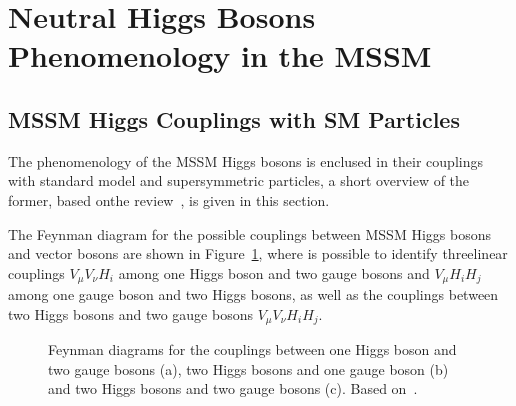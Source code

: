 \section{Neutral Higgs Bosons Phenomenology in the MSSM}\label{sec:pheno}

\subsection{MSSM Higgs Couplings with SM Particles}\label{sec:couplings}
The phenomenology of the MSSM Higgs bosons is enclused in their couplings with standard model and supersymmetric particles, 
a short overview of the former, based onthe review~\cite{Djuadi}, is given in this section.

The Feynman diagram for the possible couplings between MSSM Higgs bosons and vector bosons are shown in Figure~\ref{fig:couplings}, where is possible to identify threelinear 
couplings $V_{\mu}V_{\nu}H_i$ among one Higgs boson and two gauge bosons and $V_{\mu}H_{i}H_j$ among one gauge boson and two Higgs bosons,
as well as the couplings between two Higgs bosons and two gauge bosons $V_{\mu}V_{\nu}H_iH_j$.
\begin{figure}[tp]
     \begin{center}
     \end{center}
   \label{fig:couplings}
    \caption{Feynman diagrams for the couplings between one Higgs boson and two gauge bosons (a), two Higgs bosons and one gauge boson (b)
		and two Higgs bosons and two gauge bosons (c). Based on~\cite{Djuadi}. }
\end{figure}
